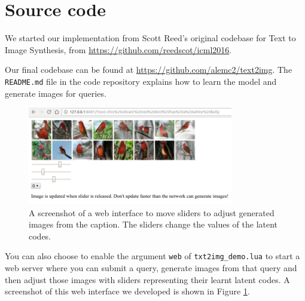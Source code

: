 \documentclass{article}
\begin{document}
\section*{Source code}

We started our implementation from Scott Reed's original codebase for Text to Image Synthesis, from \url{https://github.com/reedscot/icml2016}.

Our final codebase can be found at \url{https://github.com/alemc2/text2img}. The \texttt{README.md} file in the code repository explains how to learn the model and generate images for queries.

\begin{figure}
    \centering
    \includegraphics[width=0.8\textwidth]{web}
    \caption{A screenshot of a web interface to move sliders to adjust generated images from the caption. The sliders change the values of the latent codes.}
    \label{fig:web}
\end{figure}

You can also choose to enable the argument \texttt{web} of \texttt{txt2img\_demo.lua} to start a web server where you can submit a query, generate images from that query and then adjust those images with sliders representing their learnt latent codes. A screenshot of this web interface we developed is shown in Figure \ref{fig:web}.


\small

\end{document}
